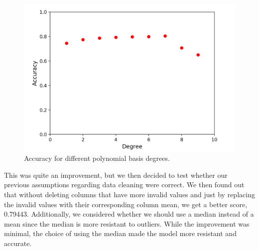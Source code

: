 \documentclass[10pt,conference,compsocconf]{IEEEtran}
\begin{document}
\begin{figure}[h]
  \centering
  \includegraphics[width=0.9\columnwidth]{polynomial_basis_degrees}
  \caption{Accuracy for different polynomial basis degrees.}
  \vspace{-3mm}
\end{figure}

This was quite an improvement, but we then decided to test whether our previous assumptions regarding data cleaning were correct. We then found out that without deleting columns that have more invalid values and just by replacing the invalid values with their corresponding column mean, we get a better score, 0.79443. Additionally, we considered whether we should use a median instead of a mean since the median is more resistant to outliers. While the improvement was minimal, the choice of using the median made the model more resistant and accurate.
\end{document}
